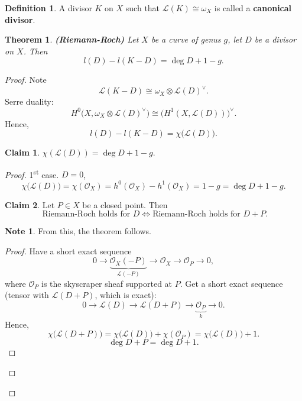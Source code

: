 \documentclass[12pt]{article}
\newtheorem*{theorem}{Theorem}
\theoremstyle{definition}
\newtheorem*{definition}{Definition}
\newtheorem*{note}{Note}
\newtheorem*{claim}{Claim}
\theoremstyle{remark}
\newtheorem*{comment}{Comment}
\begin{document}
\begin{definition}
A divisor $K$ on $X$ such that $\mathcal{L}(K)\cong\omega_X$ is called a \textbf{canonical divisor}.
\end{definition}

\begin{theorem}
\emph{\textbf{(Riemann-Roch)}} Let $X$ be a curve of genus $g$, let $D$ be a divisor on $X$. Then
\[l(D)-l(K-D)=\deg D+1-g.\]
\end{theorem}

\begin{proof}
Note
\[\mathcal{L}(K-D)\cong\omega_X\otimes\mathcal{L}(D)^{\vee}.\]
Serre duality:
\[H^0\big(X,\omega_X\otimes\mathcal{L}(D)^{\vee}\big)\cong\big(H^1(X,\mathcal{L}(D))\big)^{\vee}.\]
Hence,
\[l(D)-l(K-D)=\chi\big(\mathcal{L}(D)\big).\]
\begin{claim}
$\chi(\mathcal{L}(D))=\deg D+1-g$.
\end{claim}
\begin{proof}
1\textsuperscript{st} case. $D=0$,
\[\chi\big(\mathcal{L}(D)\big)=\chi(\mathcal{O}_X)=h^0(\mathcal{O}_X)-h^1(\mathcal{O}_X)=1-g=\deg D+1-g.\]
\begin{claim}
Let $P\in X$ be a closed point. Then
\[\text{ Riemann-Roch holds for }D\Longleftrightarrow\text{Riemann-Roch holds for }D+P.\]
\end{claim}
\begin{note}
From this, the theorem follows.
\end{note}
\begin{proof}
Have a short exact sequence
\[0\longrightarrow\underbrace{\mathcal{O}_X(-P)}_{\mathcal{L}(-P)}\longrightarrow\mathcal{O}_X\longrightarrow\mathcal{O}_P\longrightarrow0,\]
where $\mathcal{O}_P$ is the skyscraper sheaf supported at $P$. Get a short exact sequence (tensor with $\mathcal{L}(D+P)$, which is exact):
\[0\longrightarrow\mathcal{L}(D)\longrightarrow\mathcal{L}(D+P)\longrightarrow\underbrace{\mathcal{O}_P}_k\longrightarrow0.\]
Hence,
\[\chi\big(\mathcal{L}(D+P)\big)=\chi\big(\mathcal{L}(D)\big)+\chi(\mathcal{O}_P)=\chi\big(\mathcal{L}(D)\big)+1.\]
\[\deg D+P=\deg D+1.\]
\end{proof}
\end{proof}
\end{proof}

\begin{comment}
Although the previous proof is apparently simple, we need to be aware of the complexity lying in the used machinery; this is, Serre duality.
\end{comment}
\end{document}
